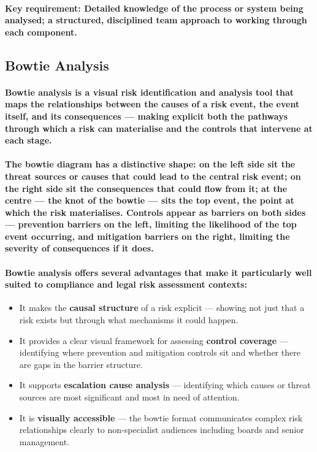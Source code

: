 \paragraph{\textbf{Key requirement}: Detailed knowledge of the process or system being analysed; a structured, disciplined team approach to working through each component.}

\subsection{Bowtie Analysis}
\paragraph{\textbf{Bowtie analysis} is a visual risk identification and analysis tool that maps the relationships between the causes of a risk event, the event itself, and its consequences — making explicit both the pathways through which a risk can materialise and the controls that intervene at each stage.}
\paragraph{The bowtie diagram has a distinctive shape: on the left side sit the \textbf{threat sources} or causes that could lead to the central risk event; on the right side sit the \textbf{consequences} that could flow from it; at the centre — the knot of the bowtie — sits the \textbf{top event}, the point at which the risk materialises. Controls appear as barriers on both sides — \textbf{prevention barriers} on the left, limiting the likelihood of the top event occurring, and \textbf{mitigation barriers} on the right, limiting the severity of consequences if it does.}
\paragraph{Bowtie analysis offers several advantages that make it particularly well suited to compliance and legal risk assessment contexts:}
\begin{itemize}
    \item{It makes the \textbf{causal structure} of a risk explicit — showing not just that a risk exists but through what mechanisms it could happen.}
    \item{It provides a clear visual framework for assessing \textbf{control coverage} — identifying where prevention and mitigation controls sit and whether there are gaps in the barrier structure.}
    \item{It supports \textbf{escalation cause analysis} — identifying which causes or threat sources are most significant and most in need of attention.}
    \item{It is \textbf{visually accessible} — the bowtie format communicates complex risk relationships clearly to non-specialist audiences including boards and senior management.}
\end{itemize}
